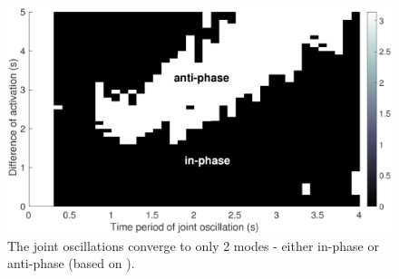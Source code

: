 \documentclass[12pt,twoside]{article}
\theoremstyle{plain}
\theoremstyle{definition}
\theoremstyle{remark}
\begin{document}
\begin{figure}[htbp]
\centering
\includegraphics[scale=0.3]{figures/5-1-stable-attractors.eps}
\caption{The joint oscillations converge to only 2 modes - either in-phase or anti-phase (based on \cite{Ronsse2009}).}
\label{fig:stable-attractors}
\end{figure}
\end{document}
